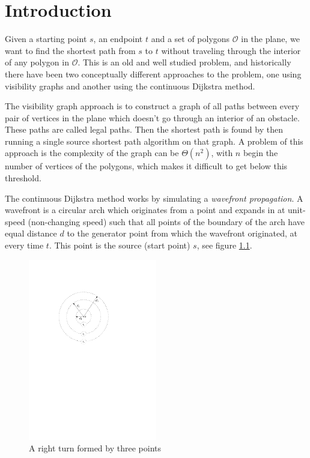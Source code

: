 \chapter{Introduction} 
Given a starting point $s$, an endpoint $t$ and a set of
polygons $\mathcal{O}$ in the plane, we want to find the shortest path from $s$ to $t$ 
without traveling through the interior of any polygon in $\mathcal{O}$. 
This is an old and well studied problem, and historically there have been two
conceptually different approaches to the problem, one using visibility graphs and
another using the continuous Dijkstra method. 

The visibility graph approach is to construct a graph of all paths between every pair 
of vertices in the plane which doesn't go through an interior of an obstacle. 
These paths are called legal paths. Then the shortest path is found by then running a 
single source shortest path algorithm on that graph. A problem of this approach
is the complexity of the graph can be $\Theta(n^2)$, with $n$ begin the number of vertices of the polygons,
which makes it difficult to get below this threshold. 

The continuous Dijkstra method works by simulating a \emph{wavefront propagation}.
A wavefront is a circular arch which originates from a point and expands in at unit-speed
(non-changing speed) such that all points of the boundary of the arch have equal distance 
$d$ to the generator point from which the wavefront originated, at every time $t$. 
This point is the source (start point) $s$, see figure \ref{fig:simplewavefront}.

\begin{figure}[H]
    \centering
	\includegraphics[width=0.5\textwidth]{figures/simplewavefront.pdf}
	\caption{A right turn formed by three points}
    \label{fig:simplewavefront}
\end{figure}

